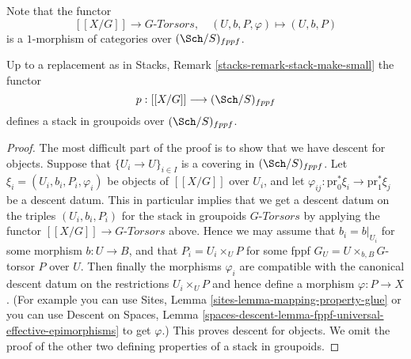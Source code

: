 \medskip\noindent
Note that the functor
$$
[[X/G]] \longrightarrow G\textit{-Torsors},
\quad
(U, b, P, \varphi) \longmapsto (U, b, P)
$$
is a $1$-morphism of categories over $(\Sch/S)_{fppf}$.

\begin{lemma}
\label{lemma-group-quotient-stack-in-groupoids}
Up to a replacement as in
Stacks, Remark \ref{stacks-remark-stack-make-small}
the functor
$$
p : [[X/G]] \longrightarrow (\Sch/S)_{fppf}
$$
defines a stack in groupoids over $(\Sch/S)_{fppf}$.
\end{lemma}

\begin{proof}
The most difficult part of the proof is to show that we have descent for
objects. Suppose that $\{U_i \to U\}_{i \in I}$ is a covering in
$(\Sch/S)_{fppf}$. Let
$\xi_i = (U_i, b_i, P_i, \varphi_i)$ be objects of $[[X/G]]$ over $U_i$,
and let $\varphi_{ij} : \text{pr}_0^*\xi_i \to \text{pr}_1^*\xi_j$
be a descent datum. This in particular implies that we get a descent
datum on the triples $(U_i, b_i, P_i)$ for the stack in groupoids
$G\textit{-Torsors}$ by applying the functor
$[[X/G]] \to G\textit{-Torsors}$ above. Hence we may assume that
$b_i = b|_{U_i}$ for some morphism $b : U \to B$, and
that $P_i = U_i \times_U P$ for some fppf $G_U = U \times_{b, B} G$-torsor
$P$ over $U$. Then finally the morphisms $\varphi_i$ are compatible
with the canonical descent datum on the restrictions $U_i \times_U P$
and hence define a morphism $\varphi : P \to X$. (For example you
can use
Sites, Lemma \ref{sites-lemma-mapping-property-glue}
or you can use
Descent on Spaces,
Lemma \ref{spaces-descent-lemma-fppf-universal-effective-epimorphisms}
to get $\varphi$.)
This proves descent for objects.
We omit the proof of the other two defining properties of a stack in
groupoids.
\end{proof}

